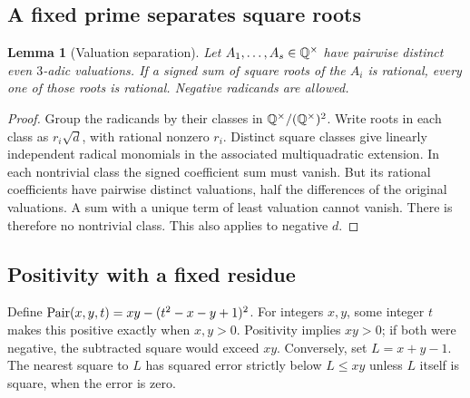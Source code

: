 \documentclass[11pt]{article}
\newtheorem{lemma}[theorem]{Lemma}
\theoremstyle{remark}\newtheorem{remark}[theorem]{Remark}
\begin{document}
\subsection{A fixed prime separates square roots}
\begin{lemma}[Valuation separation]\label{lem:valuation}
Let $A_1,\ldots,A_s\in\mathbb Q^\times$ have pairwise distinct even $3$-adic
valuations. If a signed sum of square roots of the $A_i$ is rational,
every one of those roots is rational. Negative radicands are allowed.
\end{lemma}
\begin{proof}
Group the radicands by their classes in $\mathbb Q^\times/(\mathbb Q^\times)^2$.
Write roots in each class as $r_i\sqrt d$, with rational nonzero $r_i$.
Distinct square classes give linearly independent radical monomials in
the associated multiquadratic extension. In each nontrivial class the
signed coefficient sum must vanish. But its rational coefficients have
pairwise distinct valuations, half the differences of the original
valuations. A sum with a unique term of least valuation cannot vanish.
There is therefore no nontrivial class. This also applies to negative $d$.
\end{proof}

\subsection{Positivity with a fixed residue}
Define $\operatorname{Pair}(x,y,t)=xy-(t^2-x-y+1)^2$. For integers $x,y$, some integer
$t$ makes this positive exactly when $x,y>0$. Positivity implies $xy>0$;
if both were negative, the subtracted square would exceed $xy$.
Conversely, set $L=x+y-1$. The nearest square to $L$ has squared error
strictly below $L\le xy$ unless $L$ itself is square, when the error is zero.
\end{document}
